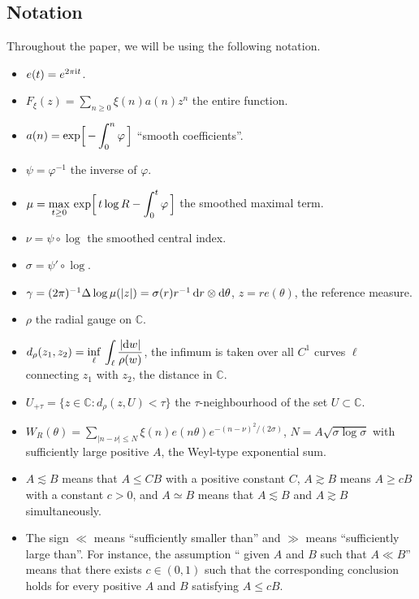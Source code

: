 \documentclass[11pt]{amsart}
\numberwithin{equation}{section}
\newcommand{\bC}{\mathbb C}
\begin{document}
\subsection*{Notation}
Throughout the paper, we will be using the following notation.
\begin{itemize}
\item $e(t)=e^{2\pi {\rm i}t}$.
\item $F_\xi(z) = \displaystyle \sum_{n\ge 0} \xi(n) a(n) z^n$ the entire function.
\item $a(n) = \displaystyle \exp\Bigl[\, -\int_0^n \varphi \,\Bigr]$ ``smooth coefficients''.
\item $\psi = \varphi^{-1}$ the inverse of $\varphi$.
\item $\mu = \displaystyle \max_{t\ge 0}\, \exp\Bigl[\,
t\log R - \int_0^t \varphi \,\Bigr]$ the smoothed maximal term.
\item $\nu = \psi\circ\log$ the smoothed central index.
\item $\sigma = \psi'\circ\log$.
\item $\gamma=(2\pi)^{-1}\Delta\log\mu(|z|) =
\sigma (r)r^{-1}\, {\rm d}r \otimes {\rm d}\theta$, $z=r e(\theta)$, the reference measure.
\item $\rho$ the radial gauge on $\bC$.
\item $d_\rho (z_1, z_2) = \displaystyle \inf_\ell\, \int_\ell \frac{|{\rm d}w|}{\rho(w)}$,
the infimum is taken over all $C^1$ curves $\ell$ connecting $z_1$ with $z_2$, the distance in $\bC$.
\item $U_{+\tau} = \{z\in\bC\colon d_\rho(z, U)<\tau\}$ the $\tau$-neighbourhood of the set
$U\subset \bC$.
\item $W_R(\theta) = \displaystyle
\sum_{|n-\nu|\le N} \xi (n)e(n\theta) e^{-(n-\nu)^2/(2\sigma)}$,
$N=A\sqrt{\sigma\log\sigma}$ with sufficiently large positive $A$, the Weyl-type exponential sum.
\item $A\lesssim B$ means that $A\le CB$ with a positive constant $C$,
$A \gtrsim B$ means $A\ge cB$ with a constant $c>0$, and $A\simeq B$ means that $A\lesssim B$ and
$A\gtrsim B$ simultaneously.
\item The sign $\ll$ means ``sufficiently smaller than'' and $\gg$ means ``sufficiently large than''. For instance, the assumption `` given $A$ and $B$ such that $A\ll B$'' means that there exists
    $c\in (0, 1)$ such that the corresponding conclusion holds for every positive $A$ and $B$ satisfying $A\le cB$.
\end{itemize}
\end{document}
